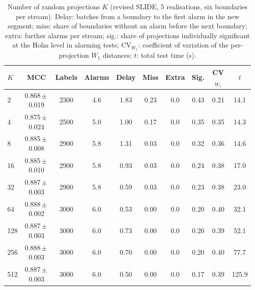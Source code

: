 \begin{table}[t]
\centering
\caption{Number of random projections $K$ (revised SLIDE, 5 realisations, six boundaries per stream). Delay: batches from a boundary to the first alarm in the new segment; miss: share of boundaries without an alarm before the next boundary; extra: further alarms per stream; sig.: share of projections individually significant at the Holm level in alarming tests; CV$_{W_1}$: coefficient of variation of the per-projection $W_1$ distances; $t$: total test time (s).}
\label{tab:rev-K}
\scriptsize
\setlength{\tabcolsep}{3pt}
\begin{tabular}{@{}lccccccccc@{}}
\toprule
$K$ & MCC & Labels & Alarms & Delay & Miss & Extra & Sig. & CV$_{W_1}$ & $t$ \\
\midrule
2 & 0.868\,$\pm$\,0.019 & 2300 & 4.6 & 1.83 & 0.23 & 0.0 & 0.43 & 0.21 & 14.1 \\
4 & 0.875\,$\pm$\,0.024 & 2500 & 5.0 & 1.00 & 0.17 & 0.0 & 0.35 & 0.35 & 14.3 \\
8 & 0.885\,$\pm$\,0.008 & 2900 & 5.8 & 1.31 & 0.03 & 0.0 & 0.32 & 0.36 & 14.6 \\
16 & 0.885\,$\pm$\,0.010 & 2900 & 5.8 & 0.93 & 0.03 & 0.0 & 0.24 & 0.38 & 17.0 \\
32 & 0.887\,$\pm$\,0.003 & 2900 & 5.8 & 0.59 & 0.03 & 0.0 & 0.23 & 0.38 & 23.0 \\
64 & 0.888\,$\pm$\,0.002 & 3000 & 6.0 & 0.53 & 0.00 & 0.0 & 0.20 & 0.40 & 32.1 \\
128 & 0.887\,$\pm$\,0.003 & 3000 & 6.0 & 0.73 & 0.00 & 0.0 & 0.20 & 0.39 & 52.1 \\
256 & 0.888\,$\pm$\,0.003 & 3000 & 6.0 & 0.70 & 0.00 & 0.0 & 0.20 & 0.40 & 77.7 \\
512 & 0.887\,$\pm$\,0.003 & 3000 & 6.0 & 0.50 & 0.00 & 0.0 & 0.17 & 0.39 & 125.9 \\
\bottomrule
\end{tabular}
\end{table}

